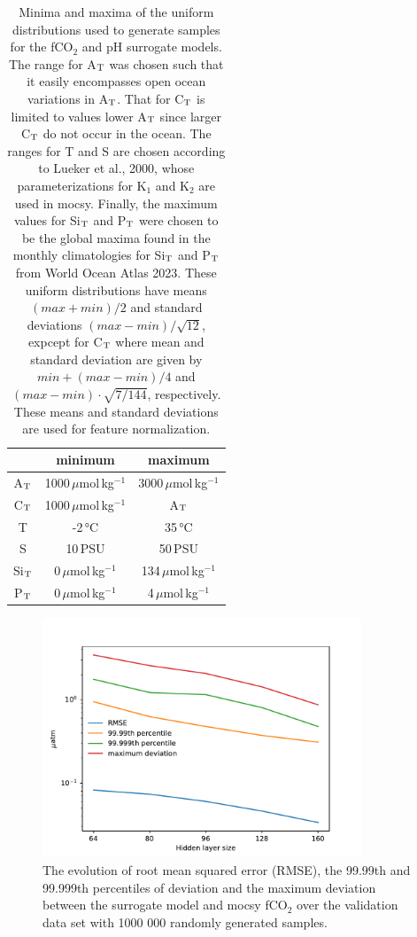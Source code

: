 \documentclass{article}
\begin{document}
	\begin{table}
		\centering
		\bgroup
		\def\arraystretch{1.5}
		\begin{tabular}{c|c|c}
			& minimum & maximum \\
			\hline 
			A$_\textup{T}$ & 1000\,$\mu$mol\,kg$^{-1}$ & 3000\,$\mu$mol\,kg$^{-1}$ \\
			\hline
			C$_\textup{T}$ & 1000\,$\mu$mol\,kg$^{-1}$ & A$_\textup{T}$ \\
			\hline
			T & -2\,°C & 35\,°C \\
			\hline
			S & 10\,PSU & 50\,PSU \\
			\hline
			Si$_\textup{T}$ & 0\,$\mu$mol\,kg$^{-1}$ & 134\,$\mu$mol\,kg$^{-1}$ \\
			\hline
			P$_\textup{T}$ & 0\,$\mu$mol\,kg$^{-1}$ & 4\,$\mu$mol\,kg$^{-1}$ \\
			
		\end{tabular}
		\egroup
		\caption{Minima and maxima of the uniform distributions used to generate samples for the fCO$_2$ and pH surrogate models. The range for A$_\textup{T}$ was chosen such that it easily encompasses open ocean variations in A$_\textup{T}$. That for C$_\textup{T}$ is limited to values lower A$_\textup{T}$ since larger C$_\textup{T}$ do not occur in the ocean. The ranges for T and S are chosen according to Lueker et al., 2000, whose parameterizations for K$_1$ and K$_2$ are used in mocsy. Finally, the maximum values for Si$_\textup{T}$ and P$_\textup{T}$ were chosen to be the global maxima found in the monthly climatologies for Si$_\textup{T}$ and P$_\textup{T}$ from World Ocean Atlas 2023. These uniform distributions have means $(max + min) / 2$ and standard deviations $(max - min) / \sqrt{12}$, expcept for C$_\textup{T}$ where mean and standard deviation are given by $min + (max - min) / 4$ and $(max - min) \cdot \sqrt{7 / 144}$, respectively. These means and standard deviations are used for feature normalization.}
		\label{tab:gen_data}
	\end{table}
	\begin{figure}
		\includegraphics[width=0.85\textwidth]{./figures/fco2_model_error_vs_hidden_layer_size.pdf}
		\caption{The evolution of root mean squared error (RMSE), the 99.99th and 99.999th percentiles of deviation and the maximum deviation between the surrogate model and mocsy fCO$_2$ over the validation data set with 1000 000 randomly generated samples.}
		\label{fig:fco2_model}
	\end{figure}
\end{document}
